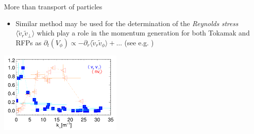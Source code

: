\documentclass[t,10pt]{beamer}
\begin{document}
\begin{frame}{More than transport of particles}
\begin{itemize}
\item Similar method may be used for the determination of the
  \emph{Reynolds stress} $\langle\tilde{v}_r\tilde{v}_{\perp}\rangle$
  which play a role in the momentum generation for both Tokamak and
  RFPs as $\partial_t(V_{\phi}) \propto
  -\partial_r\langle\tilde{v}_r\tilde{v}_{\phi}\rangle + \ldots$ {\footnotesize
  (see e.g. \parencite{Vianello:2005hf,Vianello:2005dt,Vianello:2006bn})}
\end{itemize}
\begin{center}
\includegraphics[height=4cm]{ErsFlux_vsk}
\end{center}

\end{frame}
\end{document}
